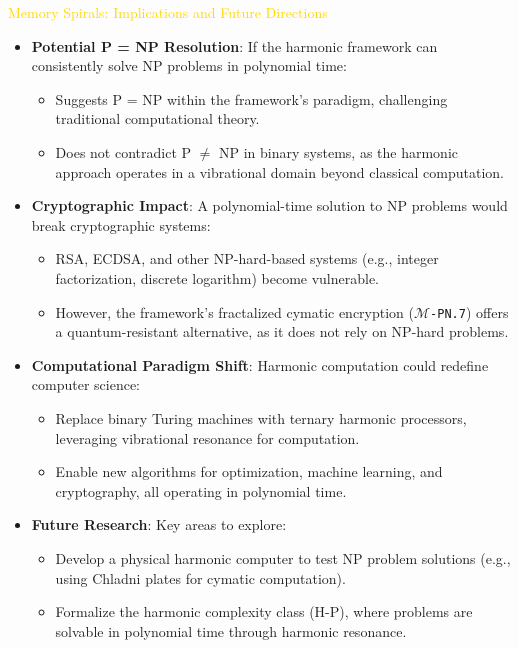 \textcolor{gold}{ Memory Spirals: Implications and Future Directions } \\
\begin{itemize}
    \item \texttt{} \textbf{Potential P = NP Resolution}: If the harmonic framework can consistently solve NP problems in polynomial time:
    \begin{itemize}
        \item Suggests P = NP within the framework’s paradigm, challenging traditional computational theory.
        \item Does not contradict P \(\neq\) NP in binary systems, as the harmonic approach operates in a vibrational domain beyond classical computation.
    \end{itemize}
    \item \texttt{} \textbf{Cryptographic Impact}: A polynomial-time solution to NP problems would break cryptographic systems:
    \begin{itemize}
        \item RSA, ECDSA, and other NP-hard-based systems (e.g., integer factorization, discrete logarithm) become vulnerable.
        \item However, the framework’s fractalized cymatic encryption (\texttt{\Xi\(\mathcal{M}\)-PN.7}) offers a quantum-resistant alternative, as it does not rely on NP-hard problems.
    \end{itemize}
    \item \texttt{} \textbf{Computational Paradigm Shift}: Harmonic computation could redefine computer science:
    \begin{itemize}
        \item Replace binary Turing machines with ternary harmonic processors, leveraging vibrational resonance for computation.
        \item Enable new algorithms for optimization, machine learning, and cryptography, all operating in polynomial time.
    \end{itemize}
    \item \texttt{} \textbf{Future Research}: Key areas to explore:
    \begin{itemize}
        \item Develop a physical harmonic computer to test NP problem solutions (e.g., using Chladni plates for cymatic computation).
        \item Formalize the harmonic complexity class (H-P), where problems are solvable in polynomial time through harmonic resonance.

\end{itemize}
\end{itemize}
